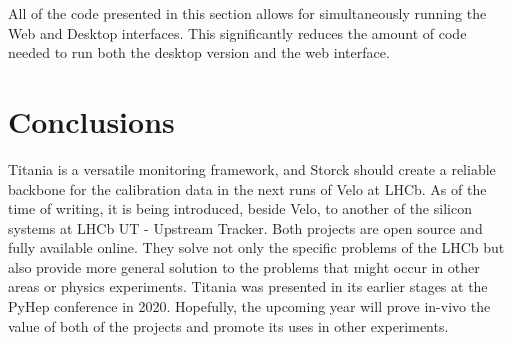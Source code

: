 All of the code presented in this section allows for simultaneously running the Web and Desktop interfaces.
This significantly reduces the amount of code needed to run both the desktop version and the web interface.

\section{Conclusions}

Titania is a versatile monitoring framework, and Storck should create a reliable backbone for the calibration data in the next runs of Velo at LHCb.
As of the time of writing, it is being introduced, beside Velo, to another of the silicon systems at LHCb UT - Upstream Tracker.
Both projects are open source and fully available online.
They solve not only the specific problems of the LHCb but also provide more general solution to the problems that might occur in other areas or physics experiments.
Titania was presented in its earlier stages at the PyHep conference in 2020.
Hopefully, the upcoming year will prove in-vivo the value of both of the projects and promote its uses in other experiments.

